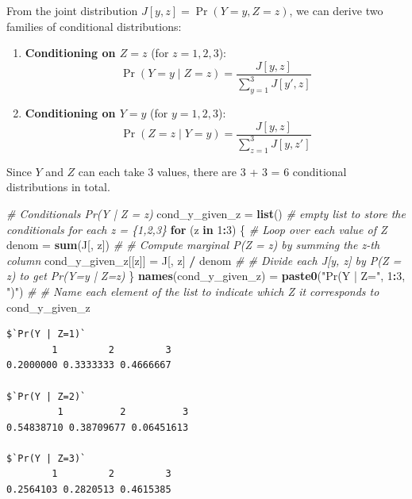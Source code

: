 \documentclass[
]{article}
\newenvironment{Shaded}{\begin{snugshade}}{\end{snugshade}}
\newcommand{\CommentTok}[1]{\textcolor[rgb]{0.56,0.35,0.01}{\textit{#1}}}
\newcommand{\ControlFlowTok}[1]{\textcolor[rgb]{0.13,0.29,0.53}{\textbf{#1}}}
\newcommand{\DecValTok}[1]{\textcolor[rgb]{0.00,0.00,0.81}{#1}}
\newcommand{\FunctionTok}[1]{\textcolor[rgb]{0.13,0.29,0.53}{\textbf{#1}}}
\newcommand{\NormalTok}[1]{#1}
\newcommand{\OtherTok}[1]{\textcolor[rgb]{0.56,0.35,0.01}{#1}}
\newcommand{\SpecialCharTok}[1]{\textcolor[rgb]{0.81,0.36,0.00}{\textbf{#1}}}
\newcommand{\StringTok}[1]{\textcolor[rgb]{0.31,0.60,0.02}{#1}}
\begin{document}
From the joint distribution \(J[y, z] = \Pr(Y = y, Z = z)\), we can
derive two families of conditional distributions:

\begin{enumerate}
\def\labelenumi{\arabic{enumi}.}
\item
  \textbf{Conditioning on \(Z = z\)} (for \(z = 1, 2, 3\)): \[
  \Pr(Y = y \mid Z = z) = \frac{J[y, z]}{\sum_{y=1}^{3} J[y', z]}
  \]
\item
  \textbf{Conditioning on \(Y = y\)} (for \(y = 1, 2, 3\)): \[
  \Pr(Z = z \mid Y = y) = \frac{J[y, z]}{\sum_{z=1}^{3} J[y, z']}
  \]
\end{enumerate}

Since \(Y\) and \(Z\) can each take 3 values, there are 3 + 3 = 6
conditional distributions in total.

\begin{Shaded}
\begin{Highlighting}[]
\CommentTok{\# Conditionals Pr(Y | Z = z)}
\NormalTok{cond\_y\_given\_z }\OtherTok{=} \FunctionTok{list}\NormalTok{() }\CommentTok{\# empty list to store the conditionals for each z = \{1,2,3\}}
\ControlFlowTok{for}\NormalTok{ (z }\ControlFlowTok{in} \DecValTok{1}\SpecialCharTok{:}\DecValTok{3}\NormalTok{) \{ }\CommentTok{\# Loop over each value of Z}
\NormalTok{  denom }\OtherTok{=} \FunctionTok{sum}\NormalTok{(J[, z]) }\CommentTok{\# \# Compute marginal P(Z = z) by summing the z{-}th column}
\NormalTok{  cond\_y\_given\_z[[z]] }\OtherTok{=}\NormalTok{ J[, z] }\SpecialCharTok{/}\NormalTok{ denom }\CommentTok{\# \# Divide each J[y, z] by P(Z = z) to get Pr(Y=y | Z=z)}
\NormalTok{\}}
\FunctionTok{names}\NormalTok{(cond\_y\_given\_z) }\OtherTok{=} \FunctionTok{paste0}\NormalTok{(}\StringTok{"Pr(Y | Z="}\NormalTok{, }\DecValTok{1}\SpecialCharTok{:}\DecValTok{3}\NormalTok{, }\StringTok{")"}\NormalTok{) }\CommentTok{\# \# Name each element of the list to indicate which Z it corresponds to}
\NormalTok{cond\_y\_given\_z}
\end{Highlighting}
\end{Shaded}

\begin{verbatim}
$`Pr(Y | Z=1)`
        1         2         3 
0.2000000 0.3333333 0.4666667 

$`Pr(Y | Z=2)`
         1          2          3 
0.54838710 0.38709677 0.06451613 

$`Pr(Y | Z=3)`
        1         2         3 
0.2564103 0.2820513 0.4615385 
\end{verbatim}
\end{document}
